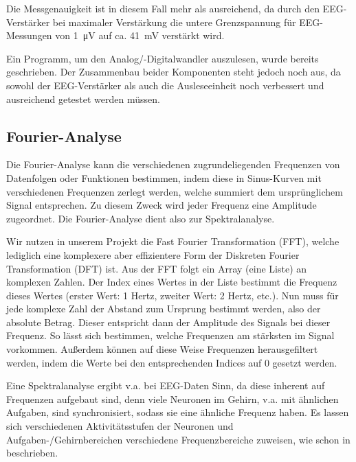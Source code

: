 \documentclass[10pt]{article}
\begin{document}
Die Messgenauigkeit ist in diesem Fall mehr als ausreichend, da durch den EEG-Verstärker bei maximaler Verstärkung die untere Grenzspannung für EEG-Messungen von \SI{1}{\micro\volt} auf ca. \SI{41}{\milli\volt} verstärkt wird. 

Ein Programm, um den Analog/-Digitalwandler auszulesen, wurde bereits geschrieben. 
Der Zusammenbau beider Komponenten steht jedoch noch aus, da sowohl der EEG-Verstärker als auch die Ausleseeinheit noch verbessert und ausreichend getestet werden müssen. 
 
 
\subsection{Fourier-Analyse}

Die Fourier-Analyse kann die verschiedenen zugrundeliegenden Frequenzen von Datenfolgen oder Funktionen bestimmen, indem diese in Sinus-Kurven mit verschiedenen Frequenzen zerlegt werden, welche summiert dem ursprünglichem Signal entsprechen.
Zu diesem Zweck wird jeder Frequenz eine Amplitude zugeordnet.
Die Fourier-Analyse dient also zur Spektralanalyse.

Wir nutzen in unserem Projekt die Fast Fourier Transformation (FFT), welche lediglich eine komplexere aber effizientere Form der Diskreten Fourier Transformation (DFT) ist.
Aus der FFT folgt ein Array (eine Liste) an komplexen Zahlen. 
Der Index eines Wertes in der Liste bestimmt die Frequenz dieses Wertes
(erster Wert: 1 Hertz, zweiter Wert: 2 Hertz, etc.). Nun muss für jede komplexe Zahl der Abstand zum Ursprung bestimmt werden, also der absolute Betrag. 
Dieser entspricht dann der Amplitude des Signals bei dieser Frequenz. So lässt sich bestimmen, welche Frequenzen am stärksten im Signal vorkommen. Außerdem können auf diese Weise Frequenzen herausgefiltert werden, indem die Werte bei den entsprechenden Indices auf 0 gesetzt werden. 

Eine Spektralanalyse ergibt v.a. bei EEG-Daten Sinn, da diese inherent auf Frequenzen aufgebaut sind, denn viele Neuronen im Gehirn, v.a. mit ähnlichen Aufgaben, sind synchronisiert, sodass sie eine ähnliche Frequenz haben.
Es lassen sich verschiedenen Aktivitätsstufen der Neuronen und Aufgaben-/Gehirnbereichen verschiedene Frequenzbereiche zuweisen, wie schon in  beschrieben.
\end{document}
